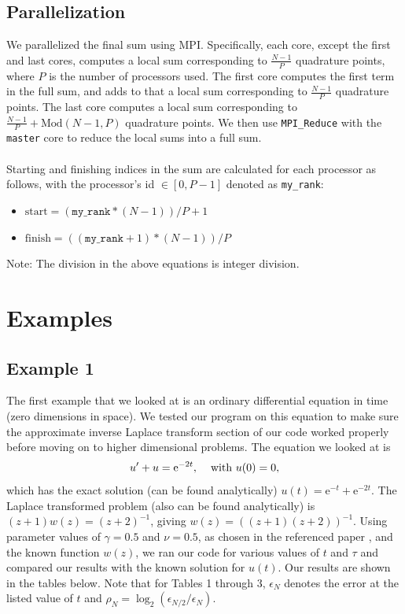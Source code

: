 \documentclass[letterpaper, 12pt]{article}
\def\e{\text{e}}
\begin{document}
		\subsection*{Parallelization}
		We parallelized the final sum using MPI. Specifically, each core, except the first and last cores, computes a local sum corresponding to $\frac{N-1}{P}$ quadrature points, where $P$ is the number of processors used. The first core computes the first term in the full sum, and adds to that a local sum corresponding to $\frac{N-1}{P}$ quadrature points. The last core computes a local sum corresponding to $\frac{N-1}{P}+\text{Mod}(N-1, P)$ quadrature points. We then use \texttt{MPI\_Reduce} with the \texttt{master} core to reduce the local sums into a full sum. \\\\
		Starting and finishing indices in the sum are calculated for each processor as follows, with the processor's id $\in[0,P-1]$ denoted as \texttt{my\_rank}:
		\begin{itemize}
		\renewcommand{\labelitemi}{--}
			\item $\text{start}=(\texttt{my\_rank}*(N-1))/P+1$
			\item $\text{finish}=((\texttt{my\_rank}+1)*(N-1))/P$
		\end{itemize}
		Note: The division in the above equations is integer division.
		
	\section*{Examples}
		\subsection*{Example 1}
		The first example that we looked at is an ordinary differential equation in time (zero dimensions in space). We tested our program on this equation to make sure the approximate inverse Laplace transform section of our code worked properly before moving on to higher dimensional problems. The equation we looked at is
		$$u'+u=\e^{-2t},\hspace{4mm}\text{with }u(0)=0,$$
		which has the exact solution (can be found analytically) $u(t)=\e^{-t}+\e^{-2t}$. The Laplace transformed problem (also can be found analytically) is $(z+1)w(z)=(z+2)^{-1}$, giving $w(z)=((z+1)(z+2))^{-1}$.	Using parameter values of $\gamma=0.5$ and $\nu=0.5$, as chosen in the referenced paper \cite{sheen03}, and the known function $w(z)$, we ran our code for various values of $t$ and $\tau$ and compared our results with the known solution for $u(t)$. Our results are shown in the tables below. Note that for Tables 1 through 3, $\epsilon_N$ denotes the error at the listed value of $t$ and $\rho_N=\log_2(\epsilon_{N/2}/\epsilon_N)$.
	
\end{document}
